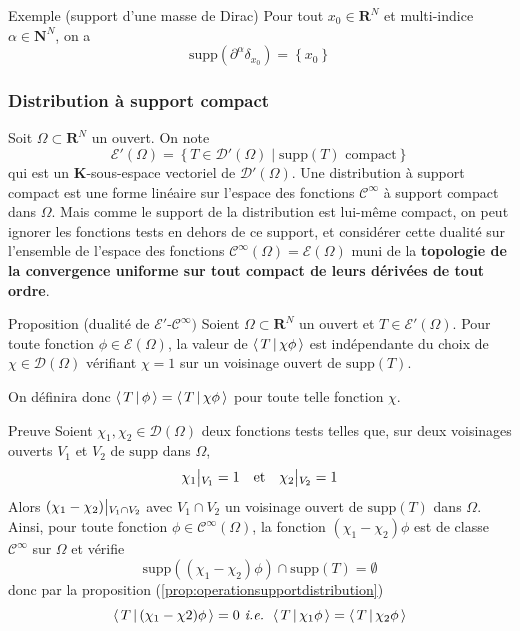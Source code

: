         \begin{demo}{Exemple (support d’une masse de Dirac)}
            Pour tout $x_0 \in \mathbf{R}^N$ et multi-indice $\alpha \in \mathbf{N}^N$, on a 
            \[ \text{supp}(\partial^{\alpha} \delta_{x_0}) = \left\{x_0\right\} \]   
        \end{demo}

        \subsubsection{Distribution à support compact}

        Soit $\Omega \subset \mathbf{R}^N$ un ouvert. On note 
        \[ \mathcal{E}'(\Omega) = \left\{T \in \mathcal{D}'(\Omega) \middle| \text{supp}(T) \text{ compact}\right\} \]
        qui est un $\mathbf{K}$-sous-espace vectoriel de $\mathcal{D}'(\Omega)$. Une distribution à support compact est une forme linéaire sur l’espace des fonctions $\mathcal{C}^{\infty}$ à support compact dans $\Omega$. Mais comme le support de la distribution est lui-même compact, on peut ignorer les fonctions tests en dehors de ce support, et considérer cette dualité sur l’ensemble de l’espace des fonctions $\mathcal{C}^{\infty}(\Omega) = \mathcal{E}(\Omega)$ muni de la \textbf{topologie de la convergence uniforme sur tout compact de leurs dérivées de tout ordre}.

        \begin{omed}{Proposition (dualité de $\mathcal{E}'$-$\mathcal{C}^{\infty})$}
            Soient $\Omega \subset \mathbf{R}^N$ un ouvert et $T \in \mathcal{E}'(\Omega)$. Pour toute fonction $\phi \in \mathcal{E}(\Omega)$, la valeur de $\left< \, T \, \middle| \, \chi \phi \, \right>$ est indépendante du choix de $\chi \in \mathcal{D}(\Omega)$ vérifiant $\chi = 1$ sur un voisinage ouvert de $\text{supp}(T)$.

            On définira donc $\left< \, T \, \middle| \, \phi \, \right> = \left< \, T \, \middle| \, \chi \phi \, \right>$ pour toute telle fonction $\chi$.
        \end{omed}

        \begin{demo}{Preuve}
            Soient $\chi_1, \chi_2 \in \mathcal{D}(\Omega)$ deux fonctions tests telles que, sur deux voisinages ouverts $V_1$ et $V_2$ de $\text{supp}$ dans $\Omega$, 
            \[ \chi_1 \big|\vphantom{|}_{V_1} = 1 \quad \text{et} \quad \chi_2 \big|\vphantom{|}_{V_2} = 1 \]
            Alors $(\chi_1 - \chi_2) \big|\vphantom{|}_{V_1 \cap V_2}$ avec $V_1 \cap V_2$ un voisinage ouvert de $\text{supp}(T)$ dans $\Omega$. Ainsi, pour toute fonction $\phi \in \mathcal{C}^{\infty}(\Omega)$, la fonction $(\chi_1 - \chi_2) \phi$ est de classe $\mathcal{C}^{\infty}$ sur $\Omega$ et vérifie 
            \[ \text{supp}((\chi_1 - \chi_2)\phi) \cap \text{supp}(T) = \emptyset \] 
            donc par la proposition (\ref{prop:operationsupportdistribution}) 
            \[ \left< \, T \, \middle| \, (\chi_1 - \chi 2) \phi \, \right> = 0 \textit{ i.e. } \left< \, T \, \middle| \, \chi_1 \phi \, \right> = \left< \, T \, \middle| \, \chi_2 \phi \, \right> \]  
        \end{demo}


